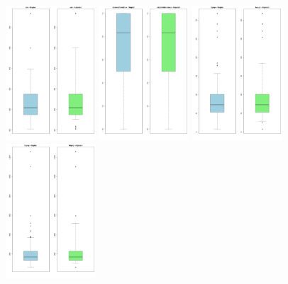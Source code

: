 \documentclass[12pt]{article}
\begin{document}
\begin{figure}[p]
  \centering
  \includegraphics[width=0.299\textwidth]{OUTPUT/BOXPLOTS/rain.png}
  \includegraphics[width=0.299\textwidth]{OUTPUT/BOXPLOTS/studentattendance.png}
  \includegraphics[width=0.299\textwidth]{OUTPUT/BOXPLOTS/tepupr.png}
  \includegraphics[width=0.299\textwidth]{OUTPUT/BOXPLOTS/totpop.png}

  \label{fig:boxplots2}
\end{figure}
\end{document}
